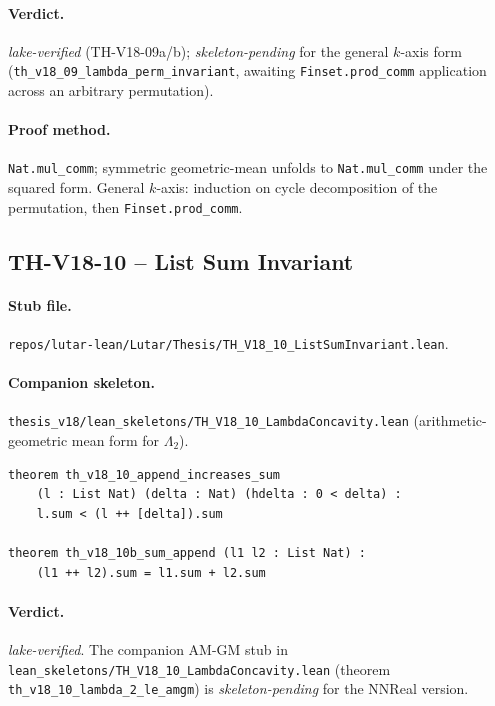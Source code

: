 \paragraph{Verdict.} \emph{lake-verified} (TH-V18-09a/b);
\emph{skeleton-pending} for the general $k$-axis form
(\texttt{th\_v18\_09\_lambda\_perm\_invariant}, awaiting
\texttt{Finset.prod\_comm} application across an arbitrary
permutation).

\paragraph{Proof method.} \texttt{Nat.mul\_comm}; symmetric
geometric-mean unfolds to \texttt{Nat.mul\_comm} under the squared
form. General $k$-axis: induction on cycle decomposition of the
permutation, then \texttt{Finset.prod\_comm}.

\subsection{TH-V18-10 -- List Sum Invariant}
\label{sub:thv18-10}

\paragraph{Stub file.}
\texttt{repos/lutar-lean/Lutar/Thesis/TH\_V18\_10\_ListSumInvariant.lean}.

\paragraph{Companion skeleton.}
\texttt{thesis\_v18/lean\_skeletons/TH\_V18\_10\_LambdaConcavity.lean}
(arithmetic-geometric mean form for $\Lambda_2$).

\begin{theorem}
\label{thm:thv18-10}
\begin{verbatim}
theorem th_v18_10_append_increases_sum
    (l : List Nat) (delta : Nat) (hdelta : 0 < delta) :
    l.sum < (l ++ [delta]).sum

theorem th_v18_10b_sum_append (l1 l2 : List Nat) :
    (l1 ++ l2).sum = l1.sum + l2.sum
\end{verbatim}
\end{theorem}

\paragraph{Verdict.} \emph{lake-verified}. The companion AM-GM stub
in \texttt{lean\_skeletons/TH\_V18\_10\_LambdaConcavity.lean}
(theorem \texttt{th\_v18\_10\_lambda\_2\_le\_amgm}) is
\emph{skeleton-pending} for the NNReal version.

